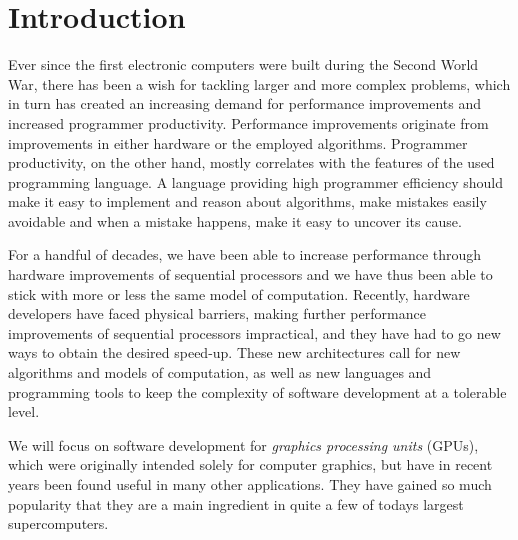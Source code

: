 
\chapter{Introduction}
Ever since the first electronic computers were built during the Second
World War, there has been a wish for tackling larger and more complex
problems, which in turn has created an increasing demand for
performance improvements and increased programmer
productivity. Performance improvements originate from improvements in
either hardware or the employed algorithms. Programmer productivity,
on the other hand, mostly correlates with the features of the used
programming language. A language providing high programmer efficiency
should make it easy to implement and reason about algorithms, make
mistakes easily avoidable and when a mistake happens, make it easy to
uncover its cause. 

For a handful of decades, we have been able to increase performance
through hardware improvements of sequential processors and we have
thus been able to stick with more or less the same model of
computation. Recently, hardware developers have faced physical
barriers, making further performance improvements of sequential
processors impractical, and they have had to go new ways to obtain the
desired speed-up. These new architectures call for new algorithms and
models of computation, as well as new languages and programming tools
to keep the complexity of software development at a tolerable level.


We will focus on software development for \textit{graphics processing
 units} (GPUs), which were originally intended solely for computer
graphics, but have in recent years been found useful in many other
applications. They have gained so much popularity that they are a main
ingredient in quite a few of todays largest
supercomputers. 

